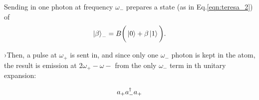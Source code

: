   Sending in one photon at frequency $ \omega_- $ prepares a state (as in Eq.\eqref{eqn:teresa_2}) of 
  \[
  	\ket{\beta}_- = B\bigg(\ket{0} + \beta\ket{1}\bigg).
  \]
  
  \noindent {} ›Then, a pulse at $ \omega_+ $ is sent in, and since only one $ \omega_- $ photon is kept in the atom, the result is emission at $ 2\omega_+ - \omega- $ from the only $ \omega_- $ term in th unitary expansion:
  
  \[
  	a_+a^{\dagger}_-a_+
  \]
  


\newpage